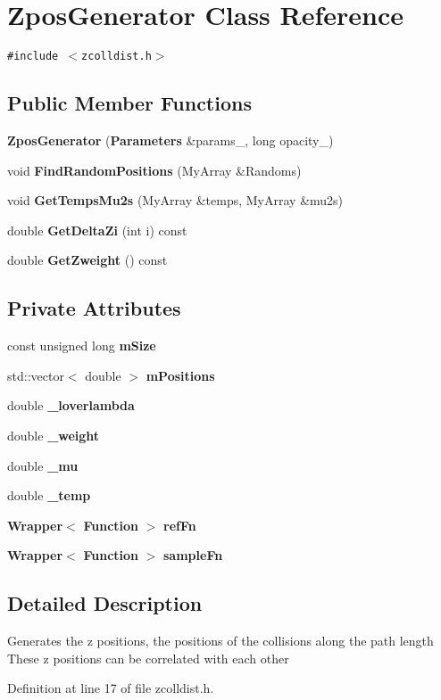 \section{ZposGenerator Class Reference}
\label{classZposGenerator}
{\tt \#include $<$zcolldist.h$>$}

\subsection*{Public Member Functions}
\begin{CompactItemize}
\item 
{\bf ZposGenerator} ({\bf Parameters} \&params\_\-, long opacity\_\-)
\item 
void {\bf FindRandomPositions} (MyArray \&Randoms)
\item 
void {\bf GetTempsMu2s} (MyArray \&temps, MyArray \&mu2s)
\item 
double {\bf GetDeltaZi} (int i) const 
\item 
double {\bf GetZweight} () const 
\end{CompactItemize}
\subsection*{Private Attributes}
\begin{CompactItemize}
\item 
const unsigned long {\bf mSize}
\item 
std::vector$<$ double $>$ {\bf mPositions}
\item 
double {\bf \_\-loverlambda}
\item 
double {\bf \_\-weight}
\item 
double {\bf \_\-mu}
\item 
double {\bf \_\-temp}
\item 
{\bf Wrapper}$<$ {\bf Function} $>$ {\bf refFn}
\item 
{\bf Wrapper}$<$ {\bf Function} $>$ {\bf sampleFn}
\end{CompactItemize}


\subsection{Detailed Description}
Generates the z positions, the positions of the collisions along the path length These z positions can be correlated with each other 

Definition at line 17 of file zcolldist.h.


